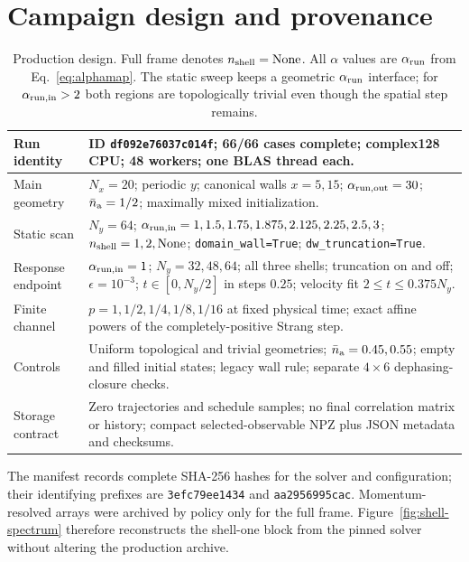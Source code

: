 \documentclass[aps,prb,twocolumn,nofootinbib,superscriptaddress,floatfix]{revtex4-2}
\begin{document}
\section{Campaign design and provenance}

\begin{table}[t]
\caption{Production design. Full frame denotes
$n_{\rm shell}=\mathrm{None}$. All $\alpha$ values are $\alpha_{\rm run}$
from Eq.~\eqref{eq:alphamap}. The static sweep keeps a geometric
$\alpha_{\rm run}$ interface; for $\alpha_{\rm run,in}>2$ both regions are
topologically trivial even though the spatial step remains.}
\label{tab:design}
\begin{tabularx}{\textwidth}{@{}>{\raggedright\arraybackslash}p{}X@{}}
\toprule
Run identity & ID \texttt{df092e76037c014f}; 66/66 cases complete; complex128 CPU; 48 workers; one BLAS thread each.\\
\midrule
Main geometry & $N_x=20$; periodic $y$; canonical walls $x=5,15$; $\alpha_{\rm run,out}=30$; $\bar n_{\rm a}=1/2$; maximally mixed initialization.\\
Static scan & $N_y=64$; $\alpha_{\rm run,in}=1,1.5,1.75,1.875,2.125,2.25,2.5,3$; $n_{\rm shell}=1,2,\mathrm{None}$; \texttt{domain\_wall=True}; \texttt{dw\_truncation=True}.\\
Response endpoint & $\alpha_{\rm run,in}=1$; $N_y=32,48,64$; all three shells; truncation on and off; $\epsilon=10^{-3}$; $t\in[0,N_y/2]$ in steps $0.25$; velocity fit $2\le t\le0.375N_y$.\\
Finite channel & $p=1,1/2,1/4,1/8,1/16$ at fixed physical time; exact affine powers of the completely-positive Strang step.\\
Controls & Uniform topological and trivial geometries; $\bar n_{\rm a}=0.45,0.55$; empty and filled initial states; legacy wall rule; separate $4\times6$ dephasing-closure checks.\\
Storage contract & Zero trajectories and schedule samples; no final correlation matrix or history; compact selected-observable NPZ plus JSON metadata and checksums.\\
\bottomrule
\end{tabularx}
\end{table}

The manifest records complete SHA-256 hashes for the solver and configuration;
their identifying prefixes are \texttt{3efc79ee1434} and
\texttt{aa2956995cac}. Momentum-resolved arrays were archived by policy only
for the full frame. Figure~\ref{fig:shell-spectrum} therefore reconstructs the
shell-one block from the pinned solver without altering the production archive.
\end{document}
